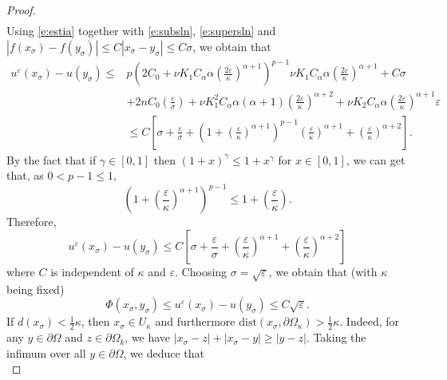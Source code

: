 \documentclass[11pt,reqno]{amsart}
\numberwithin{figure}{section}
\theoremstyle{plain}
\theoremstyle{remark}
\numberwithin{equation}{section}
\begin{document}
\begin{proof}
\begin{align}
\end{align}
Using \eqref{e:estia} together with \eqref{e:subsln}, \eqref{e:supersln} and $|f(x_\sigma) - f(y_\sigma)|\leq C|x_\sigma - y_\sigma|\leq C\sigma$, we obtain that
\begin{align*}
     u^\varepsilon(x_\sigma) - u(y_\sigma) \leq & p\left(2C_0+\nu K_1 C_\alpha \alpha\left( \frac{2\varepsilon}{\kappa}\right)^{\alpha+1}\right)^{p-1}\nu K_1 C_\alpha \alpha \left(\frac{2\varepsilon}{\kappa}\right)^{\alpha+1} + C\sigma\nonumber\\
    &+2nC_0\left(\frac{\varepsilon}{\sigma}\right) + \nu K_1^2C_\alpha \alpha(\alpha+1)\left(\frac{2\varepsilon}{\kappa}\right)^{\alpha+2} + \nu K_2 C_\alpha \alpha  \left(\frac{2\varepsilon}{\kappa}\right)^{\alpha+1}\varepsilon\nonumber\\
    &\leq C\left[\sigma + \frac{\varepsilon}{\sigma} + \left(1+\left(\frac{\varepsilon}{\kappa}\right)^{\alpha+1}\right)^{p-1}\left(\frac{\varepsilon}{\kappa}\right)^{\alpha+1} + \left(\frac{\varepsilon}{\kappa}\right)^{\alpha+2} \right].
\end{align*}
By the fact that if $\gamma\in [0,1]$ then $(1+x)^\gamma \leq 1+x^\gamma$ for $x\in [0,1]$, we can get that, as $0<p-1\leq 1$,
\begin{equation*}
    \left(1+\left(\frac{\varepsilon}{\kappa}\right)^{\alpha+1}\right)^{p-1} \leq 1+ \left(\frac{\varepsilon}{\kappa}\right).
\end{equation*}
Therefore,
\begin{equation*}
     u^\varepsilon(x_\sigma) - u(y_\sigma) \leq C\left[\sigma + \frac{\varepsilon}{\sigma} + \left(\frac{\varepsilon}{\kappa}\right)^{\alpha+1} + \left(\frac{\varepsilon}{\kappa}\right)^{\alpha+2}\right]
\end{equation*}
where $C$ is independent of $\kappa$ and $\varepsilon$. Choosing $\sigma = \sqrt{\varepsilon}$, we obtain that (with $\kappa$ being fixed)
\begin{equation}\label{e:final1}
    \Phi(x_\sigma,y_\sigma) \leq u^\varepsilon(x_\sigma) - u(y_\sigma) \leq C\sqrt{\varepsilon}.
\end{equation}
If $d(x_\sigma) < \frac{1}{2}\kappa$, then $x_\sigma \in U_\kappa$ and furthermore $\mathrm{dist}(x_\sigma,\partial \Omega_\kappa) > \frac{1}{2}\kappa$. Indeed, for any $y\in\partial\Omega$ and $z\in \partial\Omega_k$, we have $|x_\sigma - z| + |x_\sigma - y| \geq |y-z|$. Taking the infimum over all $y\in \partial\Omega$, we deduce that
\begin{equation*}

\end{equation*}
\end{proof}
\end{document}
